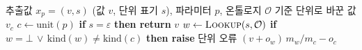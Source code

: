 \documentclass[11pt]{article}
\newcommand{\Fn}[1]{\textsc{#1}}
\begin{document}
\begin{algorithm}[t]
\caption{온톨로지 기반 단위 정규화 \Fn{Normalize}}
\label{alg:unit-normalization}
\begin{algorithmic}[1]
\Require 추출값 $x_p = (v, s)$ (값 $v$, 단위 표기 $s$), 파라미터 $p$, 온톨로지 $\mathcal{O}$
\Ensure 기준 단위로 바꾼 값 $v_c$
\State $c \gets \mathrm{unit}(p)$ 
\State \textbf{if} $s = \varepsilon$ \textbf{then return} $v$ 
\State $w \gets \Fn{Lookup}(s, \mathcal{O})$ 
\State \textbf{if} $w = \bot \,\vee\, \mathrm{kind}(w) \neq \mathrm{kind}(c)$ \textbf{then raise} 단위 오류 
\State \Return $(v + o_w)\, m_w / m_c - o_c$ 
\end{algorithmic}
\end{algorithm}
\end{document}
